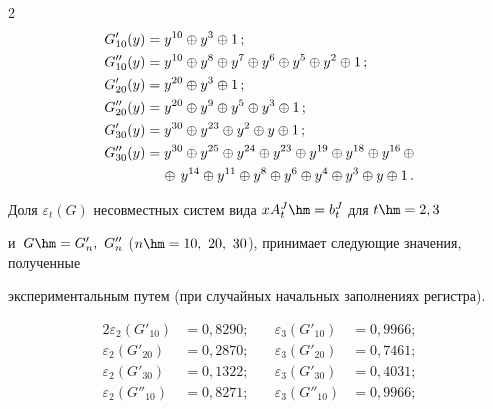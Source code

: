 \begin{multicols}{2}
\begin{align*}


  G'_{10}(y)&= y^{10}\oplus y^3\oplus 1\,;\\


  G''_{10}(y)&= y^{10}\oplus y^8\oplus y^7\oplus y^6\oplus y^5\oplus y^2\oplus 


1\,;\\


  G'_{20}(y)&= y^{20}\oplus y^3\oplus 1\,;\\


  G''_{20}(y)&= y^{20}\oplus y^9\oplus y^5\oplus y^3\oplus 1\,;\\


  G'_{30}(y)&= y^{30}\oplus y^{23}\oplus y^2\oplus y\oplus 1\,;\\


  G''_{30}(y)&= y^{30}\oplus y^{25}\oplus y^{24}\oplus y^{23}\oplus 


y^{19}\oplus y^{18}\oplus y^{16}\,\oplus\\


&\hspace*{4mm}\oplus\, y^{14}\oplus y^{11}\oplus y^8\oplus y^6\oplus y^4\oplus y^3\oplus 


y\oplus 1\,.


\end{align*}


Доля $\varepsilon_t(G)$ несовместных систем вида $xA^{J}_t\hm=b^{J}_t$ для $t\hm=2, 3$ 


и~$G\hm=G'_n,\ G''_n$ ($n\hm=10,\ 20,\ 30$), принимает следующие значения, полученные 


экспериментальным путем (при случайных начальных заполнениях регистра).


\begin{alignat*}{2}


    \varepsilon_2\left(G'_{10}\right)&= 0{,}8290; &\quad \varepsilon_3\left(G'_{10}\right)&= 0{,}9966;  \\


    \varepsilon_2\left(G'_{20}\right)&= 0{,}2870; &\quad \varepsilon_3\left(G'_{20}\right)&= 0{,}7461;  \\


    \varepsilon_2\left(G'_{30}\right)&= 0{,}1322; &\quad \varepsilon_3\left(G'_{30}\right)&= 0{,}4031;  \\


    \varepsilon_2\left(G''_{10}\right)&= 0{,}8271; &\quad \varepsilon_3\left(G''_{10}\right)&= 0{,}9966; \\



\end{alignat*}
\end{multicols}
